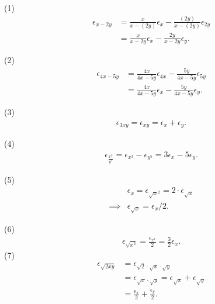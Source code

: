 \documentclass[10pt]{article}
\begin{document}
\begin{solution}[1]  \label{sol:1}
(1)
\begin{align*}
\epsilon _{x - 2y} &   = \frac{x}{x - (2y) } \epsilon _{x} -
\frac{(2y) }{x - (2y) } \epsilon _{2y} \\
& = \frac{x}{x - 2 y } \epsilon _{x} -
\frac{2 y }{x - 2 y  } \epsilon _{y}
.
\end{align*}

(2)
\begin{align*}
\epsilon _{4x - 5y}  &  =
\frac{4x}{4x - 5y} \epsilon _{4x} - \frac{5y}{4x - 5y} \epsilon _{5y} \\
& = 
\frac{4x}{4x - 5y} \epsilon _{x} - \frac{5y}{4x - 5y} \epsilon _{y}
.
\end{align*}

(3)
\begin{align*}
\epsilon _{3xy} = \epsilon _{xy} = \epsilon _{x} + \epsilon _{y}
.
\end{align*}

(4)
\begin{align*}
\epsilon _{\frac{x^{3} }{y^{5} } } = \epsilon _{x^{3} } - \epsilon _{y^{5}} = 3 \epsilon _{x} - 5 \epsilon _{y}
.
\end{align*}

(5)
\begin{align*}
 &  \epsilon _{x} = \epsilon _{\sqrt{x}^{2}} = 2 \cdot\epsilon _{\sqrt{x}} \\
\implies & \epsilon _{\sqrt{x}} = \epsilon _{x} / 2
.
\end{align*}

(6)
\begin{align*}
\epsilon _{\sqrt{x^{3}}} = \frac{\epsilon _{x^{3}}}{2} = \frac{3}{2} \epsilon _{x}
.
\end{align*}
(7)
\begin{align*}
\epsilon _{\sqrt{2xy}}  &  = \epsilon _{\sqrt{2} \cdot  \sqrt{x} \cdot \sqrt{y}} \\
& = \epsilon _{\sqrt{x} \cdot  \sqrt{y}} = \epsilon _{\sqrt{x}} + \epsilon _{\sqrt{y}} \\
& = \frac{\epsilon _{x}}{2} + \frac{\epsilon _{y}}{2} 
.
\end{align*}


\end{solution}
\end{document}
